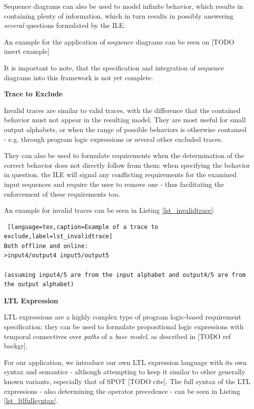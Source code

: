 Sequence diagrams can also be used to model infinite behavior, which results in containing plenty of information, which in turn results in possibly answering \textit{several} questions formulated by the ILE.

An example for the application of sequence diagrams can be seen on [TODO insert example]

It is important to note, that the specification and integration of sequence diagrams into this framework is not yet complete. 

\textbf{Trace to Exclude}

Invalid traces are similar to valid traces, with the difference that the contained behavior must not appear in the resulting model. They are most useful for small output alphabets, or when the range of possible behaviors is otherwise contained - e.g. through program logic expressions or several other excluded traces.

They can also be used to formulate requirements when the determination of the correct behavior does not directly follow from them: when specifying the behavior in question, the ILE will signal any conflicting requirements for the examined input sequences and require the user to remove one - thus facilitating the enforcement of these requirements too.

An example for invalid traces can be seen in Listing \ref{lst_invalidtrace}.

\bigskip
\begin{lstlisting} [language=tex,caption=Example of a trace to exclude,label=lst_invalidtrace]
Both offline and online:
>input4/output4 input5/output5

(assuming input4/5 are from the input alphabet and output4/5 are from the output alphabet) 
\end{lstlisting}

\textbf{LTL Expression}

LTL expressions are a highly complex type of program logic-based requirement specification: they can be used to formulate propositional logic expressions with temporal connectives over \textit{paths} of a \textit{base model}, as described in [TODO ref backgr]. 

For our application, we introduce our own LTL expression language with its own syntax and semantics - although attempting to keep it similar to other generally known variants, especially that of SPOT [TODO cite]. The full syntax of the LTL expressions - also determining the operator precedence - can be seen in Listing \ref{lst_ltlfullsyntax}.

